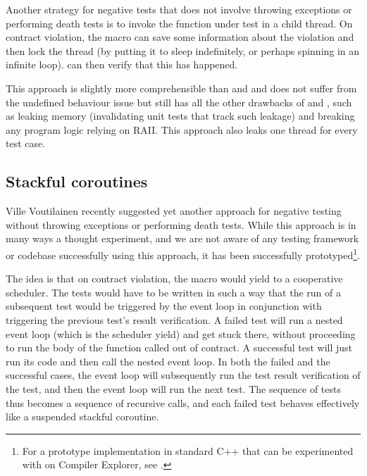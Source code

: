 Another strategy for negative tests that does not involve throwing exceptions or performing death tests is to invoke the function under test in a child thread. On contract violation, the  macro can save some information about the violation and then lock the thread (by putting it to sleep indefinitely, or perhaps spinning in an infinite loop).  can then verify that this has happened.

This approach is slightly more comprehensible than  and  and does not suffer from the undefined behaviour issue but still has all the other drawbacks of  and , such as leaking memory (invalidating unit tests that track such leakage) and breaking any program logic relying on RAII. This approach also leaks one thread for every test case.

\subsection{Stackful coroutines}

Ville Voutilainen recently suggested yet another approach for negative testing without throwing exceptions or performing death tests. While this approach is in many ways a thought experiment, and we are not aware of any testing framework or codebase successfully using this approach, it has been successfully prototyped\footnote{For a prototype implementation in standard C++ that can be experimented with on Compiler Explorer, see \hyperref[https://godbolt.org/z/obsfvzrqh]{}.}.

The idea is that on contract violation, the  macro would yield to a cooperative scheduler. The tests would have to be written in such a way that the run of a subsequent test would be triggered by the event loop in conjunction with triggering the previous test's result verification. A failed test will run a nested event loop (which is the scheduler yield) and get stuck there, without proceeding to run the body of the function called out of contract. A successful test will just run its code and then call the nested event loop. In both the failed and the successful cases, the event loop will subsequently run the test result verification of the test, and then the event loop will run the next test. The sequence of tests thus becomes a sequence of recursive calls, and each failed test behaves effectively like a suspended stackful coroutine.

